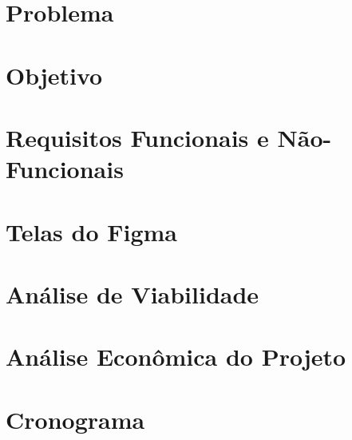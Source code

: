 \documentclass[12pt,oneside,a4paper,article]{abntex2}
\begin{document}
    \newpage                                
    \section{Problema}                      
                  
    \vspace{12mm}                           
    
    \newpage                                
    \section{Objetivo}                      
                  
    \vspace{12mm}                           
    
    \newpage                                            
    \section {Requisitos Funcionais e Não-Funcionais}   
                            
    \vspace{12mm}                                       
    
    \newpage                            
    \section{Telas do Figma}         
                 
    \vspace{12mm}                       
    
    \newpage
    \section{Análise de Viabilidade}
    
    \vspace{12mm}
    
    \newpage                                
    \section{Análise Econômica do Projeto}  
          
    \vspace{12mm}                           
    
    \newpage                                
    \section{Cronograma}                    
                
    \vspace{12mm}                           
    
\end{document}
